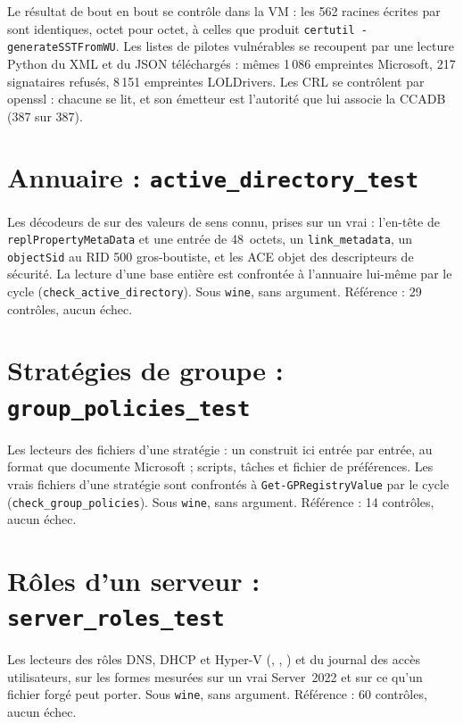 \documentclass[11pt,a4paper,oneside]{report}
\begin{document}
Le résultat de bout en bout se contrôle dans la VM : les 562 racines écrites par
 sont identiques, octet pour octet, à celles que produit
\texttt{certutil -generateSSTFromWU}. Les listes de pilotes vulnérables se
recoupent par une lecture Python du XML et du JSON téléchargés : mêmes
1\,086 empreintes Microsoft, 217 signataires refusés, 8\,151 empreintes
LOLDrivers. Les CRL se contrôlent par openssl : chacune se lit, et son
émetteur est l'autorité que lui associe la CCADB (387 sur 387).

\section{Annuaire : \texttt{active\_directory\_test}}

Les décodeurs de  sur des valeurs de sens connu,
prises sur un vrai  : l'en-tête de
\texttt{replPropertyMetaData} et une entrée de 48~octets, un
\texttt{link\_metadata}, un \texttt{objectSid} au RID 500 gros-boutiste, et les
ACE objet des descripteurs de sécurité. La lecture d'une base entière est
confrontée à l'annuaire lui-même par le cycle (\texttt{check\_active\_directory}).
Sous \texttt{wine}, sans argument. Référence : 29 contrôles, aucun échec.

\section{Stratégies de groupe : \texttt{group\_policies\_test}}

Les lecteurs des fichiers d'une stratégie : un  construit
ici entrée par entrée, au format que documente Microsoft ; scripts, tâches et
fichier de préférences. Les vrais fichiers d'une stratégie sont confrontés à
\texttt{Get-GPRegistryValue} par le cycle (\texttt{check\_group\_policies}).
Sous \texttt{wine}, sans argument. Référence : 14 contrôles, aucun échec.

\section{Rôles d'un serveur : \texttt{server\_roles\_test}}

Les lecteurs des rôles DNS, DHCP et Hyper-V (,
, ) et du journal des accès
utilisateurs, sur les formes mesurées sur un vrai Server~2022 et sur ce qu'un
fichier forgé peut porter. Sous \texttt{wine}, sans argument. Référence :
60 contrôles, aucun échec.
\end{document}
